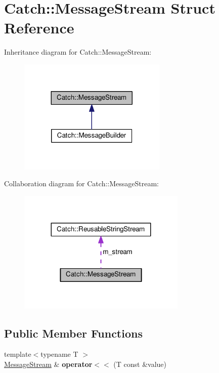 \hypertarget{structCatch_1_1MessageStream}{}\section{Catch\+:\+:Message\+Stream Struct Reference}
\label{structCatch_1_1MessageStream}


Inheritance diagram for Catch\+:\+:Message\+Stream\+:
\nopagebreak
\begin{figure}[H]
\begin{center}
\leavevmode
\includegraphics[width=200pt]{structCatch_1_1MessageStream__inherit__graph}
\end{center}
\end{figure}


Collaboration diagram for Catch\+:\+:Message\+Stream\+:
\nopagebreak
\begin{figure}[H]
\begin{center}
\leavevmode
\includegraphics[width=227pt]{structCatch_1_1MessageStream__coll__graph}
\end{center}
\end{figure}
\subsection*{Public Member Functions}
\begin{DoxyCompactItemize}
\item 
{\footnotesize template$<$typename T $>$ }\\\hyperlink{structCatch_1_1MessageStream}{Message\+Stream} \& {\bfseries operator$<$$<$} (T const \&value)\hypertarget{structCatch_1_1MessageStream_a554c4aff5925a077e9fe9d858217428d}{}\label{structCatch_1_1MessageStream_a554c4aff5925a077e9fe9d858217428d}

\end{DoxyCompactItemize}
